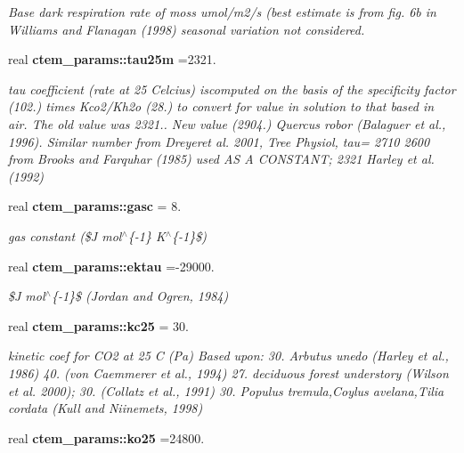 \begin{DoxyCompactItemize}
\begin{DoxyCompactList}\small\item\em Base dark respiration rate of moss umol/m2/s (best estimate is from fig. 6b in Williams and Flanagan (1998) seasonal variation not considered. \end{DoxyCompactList}\item 
\hypertarget{namespacectem__params_a26fe22d544842a462db3a764fb43effd}{}real {\bfseries ctem\+\_\+params\+::tau25m} =2321.\label{namespacectem__params_a26fe22d544842a462db3a764fb43effd}

\begin{DoxyCompactList}\small\item\em tau coefficient (rate at 25 Celcius) iscomputed on the basis of the specificity factor (102.) times Kco2/\+Kh2o (28.) to convert for value in solution to that based in air. The old value was 2321.. New value (2904.) Quercus robor (Balaguer et al., 1996). Similar number from Dreyeret al. 2001, Tree Physiol, tau= 2710 2600 from Brooks and Farquhar (1985) used A\+S A C\+O\+N\+S\+T\+A\+N\+T; 2321 Harley et al. (1992) \end{DoxyCompactList}\item 
\hypertarget{namespacectem__params_a69dfc8466b8603dc7ce853efe2fbeb27}{}real {\bfseries ctem\+\_\+params\+::gasc} = 8.\label{namespacectem__params_a69dfc8466b8603dc7ce853efe2fbeb27}

\begin{DoxyCompactList}\small\item\em gas constant (\$\+J mol$^\wedge$\{-\/1\} K$^\wedge$\{-\/1\}\$) \end{DoxyCompactList}\item 
\hypertarget{namespacectem__params_ac7eca9b5a082ee77a63738607a2b453d}{}real {\bfseries ctem\+\_\+params\+::ektau} =-\/29000.\label{namespacectem__params_ac7eca9b5a082ee77a63738607a2b453d}

\begin{DoxyCompactList}\small\item\em \$\+J mol$^\wedge$\{-\/1\}\$ (Jordan and Ogren, 1984) \end{DoxyCompactList}\item 
\hypertarget{namespacectem__params_a4346f2333823e9b18ccb292128180726}{}real {\bfseries ctem\+\_\+params\+::kc25} = 30.\label{namespacectem__params_a4346f2333823e9b18ccb292128180726}

\begin{DoxyCompactList}\small\item\em kinetic coef for C\+O2 at 25 C (Pa) Based upon\+: 30. Arbutus unedo (Harley et al., 1986) 40. (von Caemmerer et al., 1994) 27. deciduous forest understory (Wilson et al. 2000); 30. (Collatz et al., 1991) 30. Populus tremula,Coylus avelana,Tilia cordata (Kull and Niinemets, 1998) \end{DoxyCompactList}\item 
\hypertarget{namespacectem__params_aeb7cdce1fb150241fa26098d767fe9dd}{}real {\bfseries ctem\+\_\+params\+::ko25} =24800.\label{namespacectem__params_aeb7cdce1fb150241fa26098d767fe9dd}


\end{DoxyCompactItemize}
